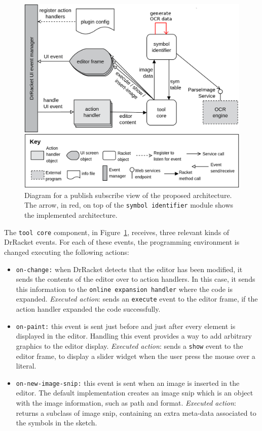 \begin{figure}[htb]
	\centering
	\includegraphics[scale=0.22]{images/solution}
	\caption{Diagram for a publish subscribe view of the proposed architecture. The arrow, in red, on top of the \texttt{symbol identifier} module shows the implemented architecture.}
	\label{fig:solution}
\end{figure}

The \texttt{tool core} component, in Figure~\ref{fig:solution}, receives, three relevant kinds of DrRacket events. For each of these events, the programming environment is changed executing the following actions:

\begin{itemize}
	\item \texttt{on-change:} when DrRacket detects that the editor has been modified, it sends the contents of the editor over to action handlers.	In this case, it sends this information to the \texttt{online expansion handler} where the code is expanded. \textit{Executed action}: sends an \texttt{execute} event to the editor frame, if the action handler expanded the code successfully. 

	\item \texttt{on-paint:} this event is sent just before and just after every element is displayed in the editor. Handling this event provides a way to add arbitrary graphics to the editor display. \textit{Executed action}: sends a \texttt{show} event to the editor frame, to display a slider widget when the user press the mouse over a literal.

	\item \texttt{on-new-image-snip:} this event is sent when an image is inserted in the editor. The default implementation creates an image snip which is an object with the image information, such as path and format. \textit{Executed action}:  returns a subclass of image snip, containing an extra meta-data associated to the symbols in the sketch.
\end{itemize}

